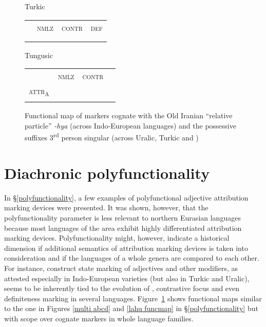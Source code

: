 {\begin{figure}
\parbox[b]{0.5\textwidth}{
\begin{center}Turkic\\
\medskip
\begin{tabular}{| m{1.4cm} || m{.9cm} | m{1.1cm} | m{.7cm} |}
\cline{1-1}
\\
\cline{1-1}
\\
\hline
 & \textsc{nmlz} & \textsc{contr} & \textsc{def}\\
\hline
\\
\cline{1-1}
\\
\cline{1-1}
\end{tabular}
\end{center}
}
\parbox[b]{0.5\textwidth}{
\begin{center}Tungusic\\
\medskip
\begin{tabular}{| m{1.4cm} || m{.9cm} | m{1.1cm} | m{.7cm} |}
\cline{1-1}
\\
\cline{1-1}
\\
\hline
 & \textsc{nmlz} & \textsc{contr} & \\
\hline
\textsc{attr}$_{\text{A}}$\\
\cline{1-1}
\\
\cline{1-1}
\end{tabular}
\end{center}
}
\caption[Functional map of cognate devices]{Functional map of markers cognate with the Old Iranian “relative particle” \textit{-hya} (across Indo-European languages) and the possessive suffixes 3\textsuperscript{rd} person singular (across Uralic, Turkic and )}
\label{ie-ural funcmap}
\end{figure}

\section{Diachronic polyfunctionality}
In \S\ref{polyfunctionality}, a few examples of polyfunctional adjective attribution marking devices were presented. It was shown, however, that the polyfunctionality parameter is less relevant to northern Eurasian languages because most languages of the area exhibit highly differentiated attribution marking devices. Polyfunctionality might, however, indicate a historical dimension if additional semantics of attribution marking devices is taken into consideration and if the languages of a whole genera are compared to each other. For instance, construct state marking of adjectives and other modifiers, as attested especially in Indo-European varieties (but also in Turkic and Uralic), seems to be inherently tied to the evolution of , contrastive focus and even definiteness marking in several languages. Figure~\ref{ie-ural funcmap} shows functional maps similar to the one in Figures \ref{multi abcd} and \ref{lahu funcmap} in \S\ref{polyfunctionality} but with scope over cognate markers in whole language families.

}

